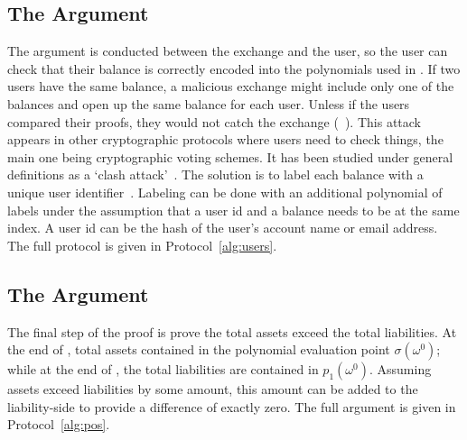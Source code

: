 
\subsection{The \userproof Argument}


The \userproof argument is conducted between the exchange and the user, so the user can check that their balance is correctly encoded into the polynomials used in \pol. If two users have the same balance, a malicious exchange might include only one of the balances and open up the same balance for each user. Unless if the users compared their proofs, they would not catch the exchange (\cf~\cite{broken}). This attack appears in other cryptographic protocols where users need to check things, the main one being cryptographic voting schemes. It has been studied under general definitions as a `clash attack'~\cite{clash}. The solution is to label each balance with a unique user identifier~\cite{provisions}. Labeling can be done with an additional polynomial of labels under the assumption that a user id and a balance needs to be at the same index. A user id can be the hash of the user's account name or email address.  The full protocol is given in Protocol~\ref{alg:users}.


\subsection{The \pos Argument}


The final step of the proof is prove the total assets exceed the total liabilities. At the end of \poa, total assets contained in the polynomial evaluation point $\sigma(\omega^0)$; while at the end of \pol, the total liabilities are contained in $p_1(\omega^0)$. Assuming assets exceed liabilities by some amount, this amount can be added to the liability-side to provide a difference of exactly zero. The full argument is given in Protocol~\ref{alg:pos}.


